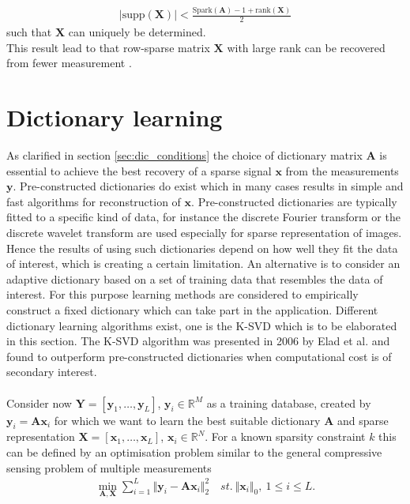 \begin{align*}
\vert \text{supp}(\mathbf{X}) \vert < \frac{\text{Spark} (\mathbf{A}) - 1 + \text{rank}(\mathbf{X})}{2}
\end{align*}
such that $\mathbf{X}$ can uniquely be determined.
\\
This result lead to that row-sparse matrix $\mathbf{X}$ with large rank can be recovered from fewer measurement \cite[p. 43]{CS}.


\section{Dictionary learning}\label{sec:dictionarylearning}
As clarified in section \ref{sec:dic_conditions} the choice of dictionary matrix $\textbf{A}$ is essential to achieve the best recovery of a sparse signal $\textbf{x}$ from the measurements $\textbf{y}$. Pre-constructed dictionaries do exist which in many cases results in simple and fast algorithms for reconstruction of $\textbf{x}$\cite{Elad_book}. Pre-constructed dictionaries are typically fitted to a specific kind of data, for instance the discrete Fourier transform or the discrete wavelet transform are used especially for sparse representation of images\cite{Elad_book}. Hence the results of using such dictionaries depend on how well they fit the data of interest, which is creating a certain limitation. An alternative is to consider an adaptive dictionary based on a set of training data that resembles the data of interest. For this purpose learning methods are considered to empirically construct a fixed dictionary which can take part in the application. Different dictionary learning algorithms exist, one is the K-SVD which is to be elaborated in this section. The K-SVD algorithm was presented in 2006 by Elad et al. and found to outperform pre-constructed dictionaries when computational cost is of secondary interest\cite{Elad2006}. \\
\\
Consider now $\textbf{Y}=\left[ \textbf{y}_1, \dots ,\textbf{y}_L \right]$, $\textbf{y}_i\in \mathbb{R}^{M}$ as a training database, created by $\textbf{y}_i=\textbf{A}\textbf{x}_i$ for which we want to learn the best suitable dictionary $\textbf{A}$ and sparse representation $\textbf{X}=\left[ \textbf{x}_1, \dots ,\textbf{x}_L \right]$, $\textbf{x}_i\in \mathbb{R}^{N}$. For a known sparsity constraint $k$ this can be defined by an optimisation problem similar to the general compressive sensing problem of multiple measurements \cite{Elad_book}
\begin{align}
\min_{\mathbf{A,X}} \sum_{i=1}^{L} \Vert \mathbf{y} _i - \mathbf{Ax}_i \Vert_2^2 \quad st. \ \Vert \textbf{x}_i\Vert_0, \ 1\leq i \leq L.\label{eq:SVD1}
\end{align}  
